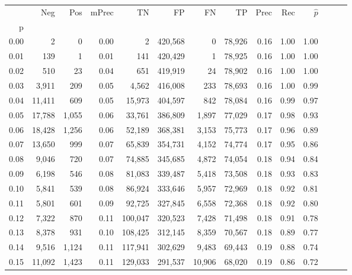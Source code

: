 \begin{tabular}{rrrrrrrrrrrrrr}
\toprule
{} &     Neg &    Pos & mPrec &       TN &       FP &      FN &      TP &  Prec &   Rec & $\hat{p}$ \\
p    &         &        &       &          &          &         &         &       &       &           \\
\midrule
0.00 &       2 &      0 &  0.00 &        2 &  420,568 &       0 &  78,926 &  0.16 &  1.00 &      1.00 \\
0.01 &     139 &      1 &  0.01 &      141 &  420,429 &       1 &  78,925 &  0.16 &  1.00 &      1.00 \\
0.02 &     510 &     23 &  0.04 &      651 &  419,919 &      24 &  78,902 &  0.16 &  1.00 &      1.00 \\
0.03 &   3,911 &    209 &  0.05 &    4,562 &  416,008 &     233 &  78,693 &  0.16 &  1.00 &      0.99 \\
0.04 &  11,411 &    609 &  0.05 &   15,973 &  404,597 &     842 &  78,084 &  0.16 &  0.99 &      0.97 \\
0.05 &  17,788 &  1,055 &  0.06 &   33,761 &  386,809 &   1,897 &  77,029 &  0.17 &  0.98 &      0.93 \\
0.06 &  18,428 &  1,256 &  0.06 &   52,189 &  368,381 &   3,153 &  75,773 &  0.17 &  0.96 &      0.89 \\
0.07 &  13,650 &    999 &  0.07 &   65,839 &  354,731 &   4,152 &  74,774 &  0.17 &  0.95 &      0.86 \\
0.08 &   9,046 &    720 &  0.07 &   74,885 &  345,685 &   4,872 &  74,054 &  0.18 &  0.94 &      0.84 \\
0.09 &   6,198 &    546 &  0.08 &   81,083 &  339,487 &   5,418 &  73,508 &  0.18 &  0.93 &      0.83 \\
0.10 &   5,841 &    539 &  0.08 &   86,924 &  333,646 &   5,957 &  72,969 &  0.18 &  0.92 &      0.81 \\
0.11 &   5,801 &    601 &  0.09 &   92,725 &  327,845 &   6,558 &  72,368 &  0.18 &  0.92 &      0.80 \\
0.12 &   7,322 &    870 &  0.11 &  100,047 &  320,523 &   7,428 &  71,498 &  0.18 &  0.91 &      0.78 \\
0.13 &   8,378 &    931 &  0.10 &  108,425 &  312,145 &   8,359 &  70,567 &  0.18 &  0.89 &      0.77 \\
0.14 &   9,516 &  1,124 &  0.11 &  117,941 &  302,629 &   9,483 &  69,443 &  0.19 &  0.88 &      0.74 \\
0.15 &  11,092 &  1,423 &  0.11 &  129,033 &  291,537 &  10,906 &  68,020 &  0.19 &  0.86 &      0.72 \\

\end{tabular}
